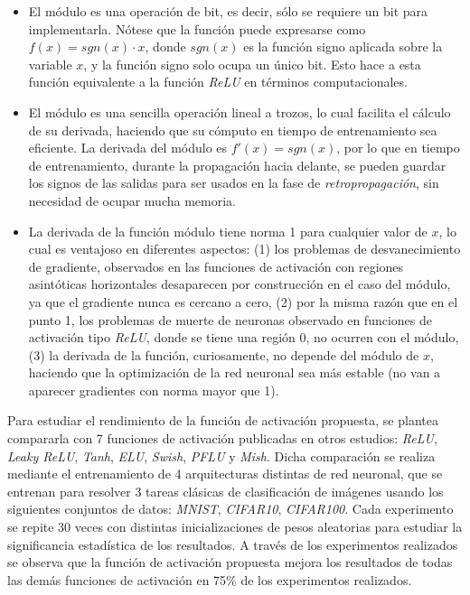 \documentclass[10pt,a4paper,titlepage,table]{report}
\begin{document}
\begin{itemize}
	\item El módulo es una operación de bit, es decir, sólo se requiere un bit para implementarla. Nótese que la función puede expresarse como $f(x) = sgn(x) \cdot x$, donde $sgn(x)$ es la función signo aplicada sobre la variable $x$, y la función signo solo ocupa un único bit. Esto hace a esta función equivalente a la función \textit{ReLU} en términos computacionales.
	\item El módulo es una sencilla operación lineal a trozos, lo cual facilita el cálculo de su derivada, haciendo que su cómputo en tiempo de entrenamiento sea eficiente. La derivada del módulo es $f'(x) = sgn(x)$, por lo que en tiempo de entrenamiento, durante la propagación hacia delante, se pueden guardar los signos de las salidas para ser usados en la fase de \textit{retropropagación}, sin necesidad de ocupar mucha memoria. 
	\item La derivada de la función módulo tiene norma 1 para cualquier valor de $x$, lo cual es ventajoso en diferentes aspectos: (1) los problemas de desvanecimiento de gradiente, observados en las funciones de activación con regiones asintóticas horizontales desaparecen por construcción en el caso del módulo, ya que el gradiente nunca es cercano a cero, (2) por la misma razón que en el punto 1, los problemas de muerte de neuronas observado en funciones de activación tipo \textit{ReLU}, donde se tiene una región 0, no ocurren con el módulo, (3) la derivada de la función, curiosamente, no depende del módulo de $x$, haciendo que la optimización de la red neuronal sea más estable (no van a aparecer gradientes con norma mayor que 1).
\end{itemize}
 
 
Para estudiar el rendimiento de la función de activación propuesta, se plantea compararla con 7 funciones de activación publicadas en otros estudios: \textit{ReLU}, \textit{Leaky ReLU}, \textit{Tanh}, \textit{ELU}, \textit{Swish}, \textit{PFLU} y \textit{Mish}. Dicha comparación se realiza mediante el entrenamiento de 4 arquitecturas distintas de red neuronal, que se entrenan para resolver 3 tareas clásicas de clasificación de imágenes usando los siguientes conjuntos de datos: \textit{MNIST}, \textit{CIFAR10}, \textit{CIFAR100}. Cada experimento se repite 30 veces con distintas inicializaciones de pesos aleatorias para estudiar la significancia estadística de los resultados. A través de los experimentos realizados se observa que la función de activación propuesta mejora los resultados de todas las demás funciones de activación en 75\% de los experimentos realizados. 
\end{document}
